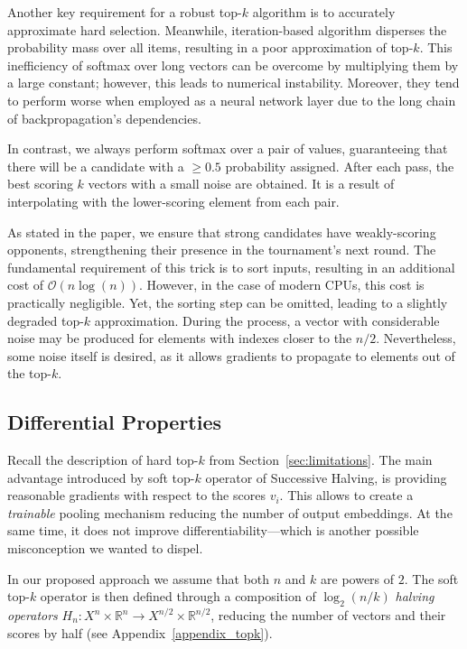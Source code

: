 \documentclass{article}
\newcommand{\RR}{\mathbb{R}}
\begin{document}
Another key requirement for a robust top-$k$ algorithm is to accurately approximate hard selection.
Meanwhile, iteration-based algorithm disperses the probability mass over all items, resulting in a poor approximation of top-$k$. This inefficiency of softmax over long vectors can be overcome by multiplying them by a large constant; however, this leads to numerical instability. 
Moreover, they tend to perform worse when employed as a neural network layer due to the long chain of backpropagation's dependencies.

In contrast, we always perform softmax over a pair of values, guaranteeing that there will be a candidate with a $\ge0.5$ probability assigned. After each pass, the best scoring $k$ vectors with a small noise are obtained. It is a result of interpolating with the lower-scoring element from each pair. 

As stated in the paper, we ensure that strong candidates have weakly-scoring opponents, strengthening their presence in the tournament's next round. The fundamental requirement of this trick is to sort inputs, resulting in an additional cost of $\mathcal{O}(n \log(n))$. However, in the case of modern CPUs, this cost is practically negligible. Yet, the sorting step can be omitted, leading to a slightly degraded top-$k$ approximation. 
During the process, a vector with considerable noise may be produced for elements with indexes closer to the $n/2$. Nevertheless, some noise itself is desired, as it allows gradients to propagate to elements out of the top-$k$.


\subsection{Differential Properties\label{sec:k2properties}}

Recall the description of hard top-$k$ from Section~\ref{sec:limitations}. The main advantage introduced by soft top-\(k\) operator of Successive Halving, is providing reasonable gradients with respect to the scores \(v_{i}\). This allows to create a \emph{trainable} pooling mechanism reducing the number of output embeddings. At the same time, it does not improve differentiability---which is another possible misconception we wanted to dispel.



In our proposed approach we assume that both \(n\) and \(k\) are powers of \(2\). The soft top-\(k\) operator is then defined through a composition of \(\log_{2}(n/k)\) \emph{halving operators} \(H_{n}\colon X^{n}\times\RR^{n} \to X^{n/2}\times \RR^{n/2}\), reducing the number of vectors and their scores by half (see Appendix~\ref{appendix_topk}).
\end{document}
